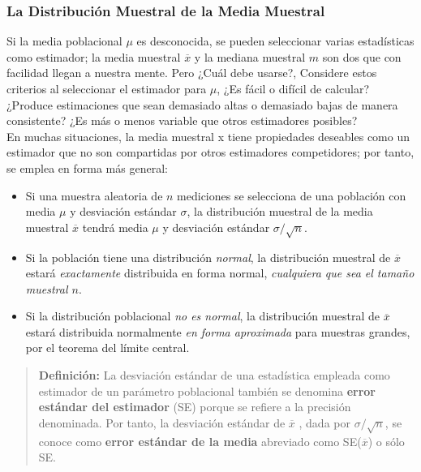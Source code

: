 \documentclass[]{article}
\begin{document}
\subsubsection{La Distribución Muestral de la Media Muestral}
Si la media poblacional $\mu$ es desconocida, se pueden seleccionar varias estadísticas como estimador; la media muestral $\overline{x}$ y la mediana muestral $m$ son dos que con facilidad llegan a nuestra mente. Pero ¿Cuál debe usarse?, Considere estos criterios al seleccionar el estimador para $\mu$, ¿Es fácil o difícil de calcular? ¿Produce estimaciones que sean demasiado altas o demasiado bajas de manera consistente? ¿Es más o menos variable que otros estimadores posibles?
\\ En muchas situaciones, la media muestral x  tiene propiedades deseables como un estimador que no son compartidas por otros estimadores competidores; por tanto, se emplea en forma más general:
\begin{itemize}
	\item Si una muestra aleatoria de $n$ mediciones se selecciona de una población con media $\mu$ y desviación estándar $\sigma$, la distribución muestral de la media muestral $\overline{x}$ tendrá media $\mu$ y desviación estándar $\sigma/\sqrt{n}$.
	\item Si la población tiene una distribución \textit{normal}, la distribución muestral de $\overline{x}$ estará \textit{exactamente} distribuida en forma normal, \textit{cualquiera que sea el tamaño muestral $n$}.
	\item Si la distribución poblacional \textit{no es normal}, la distribución muestral de $\overline{x}$  estará distribuida normalmente \textit{en forma aproximada} para muestras grandes, por el teorema del límite central.
\end{itemize}
\begin{quote}
	\textbf{Definición:} La desviación estándar de una estadística empleada como estimador de un parámetro poblacional también se denomina \textbf{error estándar del estimador} (SE) porque se refiere a la precisión denominada. Por tanto, la desviación estándar de $\overline{x}$ , dada por $\sigma/\sqrt{n}$, se conoce como \textbf{error estándar de la media} abreviado como SE($\overline{x}$) o sólo SE.
\end{quote}
\end{document}
